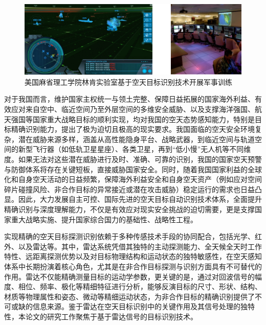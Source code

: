 \begin{figure}[h!]
    \centering
    \includegraphics[width=\linewidth]{figures/military.pdf}
    \caption{美国麻省理工学院林肯实验室基于空天目标识别技术开展军事训练}
    \label{fig:hrrp_generation}
\end{figure}

对于我国而言，维护国家主权统一与领土完整、保障日益拓展的国家海外利益、有效应对来自空中、临近空间乃至外层空间的多维安全威胁、以及支撑海洋强国、航天强国等国家重大战略目标的顺利实现，均对我国的空天态势感知能力，特别是目标精确识别能力，提出了极为迫切且极高的现实要求。我国面临的空天安全环境复杂，潜在威胁来源多样，涵盖从高性能隐身平台、战略武器，到临近空间与轨道空间的新型飞行器（如低轨卫星星座）、各类卫星，再到“低小慢”无人机等不同维度。如果无法对这些潜在威胁进行及时、准确、可靠的识别，我国的国家空天预警与防御体系将存在关键短板，直接威胁国家安全。同时，随着我国国家利益的全球化和自身空天活动的日益频繁，保障海外利益安全和自身空天资产（例如应对空间碎片碰撞风险、非合作目标的异常接近或潜在攻击威胁）稳定运行的需求也日益凸显。因此，大力发展自主可控、国际先进的空天目标自动识别技术体系，全面提升精确识别与深度理解能力，不仅是有效应对现实安全挑战的迫切需要，更是支撑国家重大战略实施、提升国家综合国力的基础性、战略性工程。

实现精确的空天目标探测识别依赖于多种传感技术手段的协同配合，包括光学、红外、以及雷达等。其中，雷达系统凭借其独特的主动探测能力、全天候全天时工作特性、远距离探测优势以及对目标物理结构和运动状态的独特敏感性，在空天感知体系中长期扮演着核心角色，尤其是在非合作目标探测与识别方面具有不可替代的作用。雷达不仅能精确测量目标的运动学参数，更关键的是，通过对回波信号的幅度、相位、频率、极化等精细特征进行分析，能够反演目标的尺寸、形状、结构、材质等物理属性和姿态、微动等精细运动状态，为非合作目标的精确识别提供了不可或缺的信息来源。鉴于雷达在空天目标识别中的关键作用及其信号处理的独特性，本论文的研究工作聚焦于基于雷达信号的目标识别技术。

